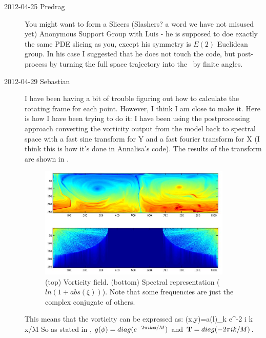\begin{description}
\item[2012-04-25 Predrag] You might want to form a Slicers (Slashers? a
word we have not misused yet) Anonymous Support Group with Luis - he is
supposed to doe exactly the same PDE slicing as you, except his symmetry
is $E(2)$ Euclidean group. In his case I suggested that he does not touch
the code, but post-process by turning the full space trajectory into the
\slice\ by finite angles.

\item[2012-04-29 Sebastian]
I have been having a bit of trouble figuring out how to calculate the
rotating frame for each point. However, I think I am close to make it.
Here is how I have been trying to do it: I have been using the
postprocessing approach converting the vorticity output from the model
back to spectral space with a fast sine transform for Y and a fast
fourier transform for X (I think this is how it's done in Annalisa's
code). The results of the transform are shown in .

    \begin{figure}[t]
    \begin{center}
    \includegraphics[width=0.9\textwidth, clip=true]{fouriervort}
    \end{center}
    \caption{(top) Vorticity field. (bottom) Spectral representation
    ($ln(1+abs(\xi))$). Note that some frequencies are just the complex
    conjugate of others.}
    \label{f:fouriervort}
    \end{figure}

This means that the vorticity can be expressed as:
    \beq
    \xi(x,y)=\sum a(l)_{k} e^{-2 i \pi k x/M}
So as stated in , $g({\bf \phi})=diag(e^{-2 \pi i k {\bf \phi} /M})$
and $\mathbf{T}=diag(-2 \pi i k/M)$.


\end{description}
